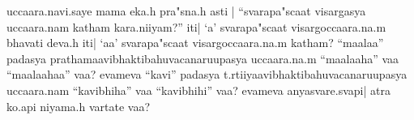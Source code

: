 \documentclass[a6paper]{article}
\begin{document}
\def\dev{\edef~{\string~}\textmarathi }
uccaara.navi.saye mama eka.h pra"sna.h asti | ``svarapa"scaat visargasya uccaara.nam katham kara.niiyam?'' iti| 
`a' svarapa"scaat visargoccaara.na.m bhavati deva.h iti| `aa' svarapa"scaat visargoccaara.na.m katham? ``maalaa'' padasya prathamaavibhaktibahuvacanaruupasya uccaara.na.m ``maalaaha'' vaa ``maalaahaa'' vaa? evameva ``kavi'' padasya t.rtiiyaavibhaktibahuvacanaruupasya uccaara.nam ``kavibhiha'' vaa ``kavibhihi'' vaa? evameva anyasvare.svapi| atra ko.api niyama.h vartate vaa?
\end{document}
